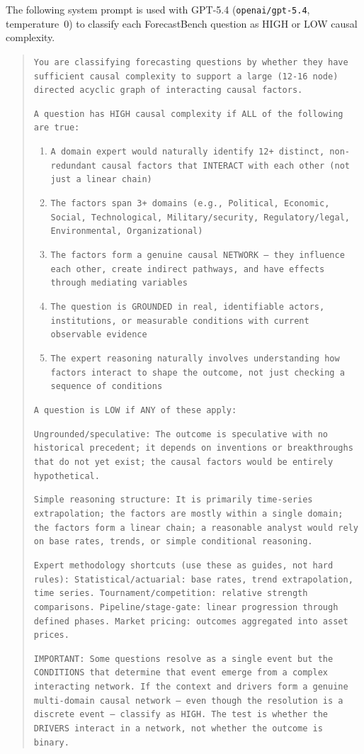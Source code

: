 \documentclass[11pt]{article}
\begin{document}
The following system prompt is used with GPT-5.4 (\texttt{openai/gpt-5.4}, temperature~0) to classify each ForecastBench question as HIGH or LOW causal complexity.

\begin{quote}
\small
\texttt{You are classifying forecasting questions by whether they have sufficient causal complexity to support a large (12-16 node) directed acyclic graph of interacting causal factors.}

\texttt{A question has HIGH causal complexity if ALL of the following are true:}
\begin{enumerate}
\small
\item \texttt{A domain expert would naturally identify 12+ distinct, non-redundant causal factors that INTERACT with each other (not just a linear chain)}
\item \texttt{The factors span 3+ domains (e.g., Political, Economic, Social, Technological, Military/security, Regulatory/legal, Environmental, Organizational)}
\item \texttt{The factors form a genuine causal NETWORK --- they influence each other, create indirect pathways, and have effects through mediating variables}
\item \texttt{The question is GROUNDED in real, identifiable actors, institutions, or measurable conditions with current observable evidence}
\item \texttt{The expert reasoning naturally involves understanding how factors interact to shape the outcome, not just checking a sequence of conditions}
\end{enumerate}

\texttt{A question is LOW if ANY of these apply:}

\texttt{Ungrounded/speculative: The outcome is speculative with no historical precedent; it depends on inventions or breakthroughs that do not yet exist; the causal factors would be entirely hypothetical.}

\texttt{Simple reasoning structure: It is primarily time-series extrapolation; the factors are mostly within a single domain; the factors form a linear chain; a reasonable analyst would rely on base rates, trends, or simple conditional reasoning.}

\texttt{Expert methodology shortcuts (use these as guides, not hard rules): Statistical/actuarial: base rates, trend extrapolation, time series. Tournament/competition: relative strength comparisons. Pipeline/stage-gate: linear progression through defined phases. Market pricing: outcomes aggregated into asset prices.}

\texttt{IMPORTANT: Some questions resolve as a single event but the CONDITIONS that determine that event emerge from a complex interacting network. If the context and drivers form a genuine multi-domain causal network --- even though the resolution is a discrete event --- classify as HIGH. The test is whether the DRIVERS interact in a network, not whether the outcome is binary.}
\end{quote}



\end{document}
